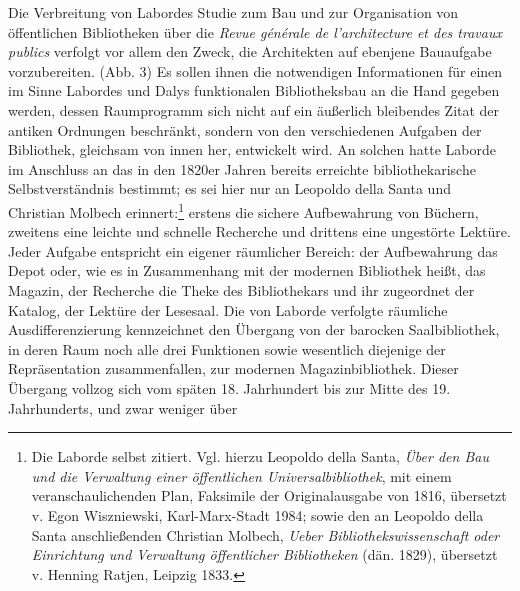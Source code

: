Die Verbreitung von Labordes Studie zum Bau und zur Organisation von
öffentlichen Bibliotheken über die \emph{Revue générale de
l'architecture et des travaux publics} verfolgt vor allem den Zweck, die
Architekten auf ebenjene Bauaufgabe vorzubereiten. (Abb. 3) Es sollen
ihnen die notwendigen Informationen für einen im Sinne Labordes und
Dalys funktionalen Bibliotheksbau an die Hand gegeben werden, dessen
Raumprogramm sich nicht auf ein äußerlich bleibendes Zitat der antiken
Ordnungen beschränkt, sondern von den verschiedenen Aufgaben der
Bibliothek, gleichsam von innen her, entwickelt wird. An solchen hatte
Laborde im Anschluss an das in den 1820er Jahren bereits erreichte
bibliothekarische Selbstverständnis bestimmt; es sei hier nur an
Leopoldo della Santa und Christian Molbech erinnert:\footnote{Die
  Laborde selbst zitiert. Vgl. hierzu Leopoldo della Santa, \emph{Über
  den Bau und die Verwaltung einer öffentlichen Universalbibliothek},
  mit einem veranschaulichenden Plan, Faksimile der Originalausgabe von
  1816, übersetzt v. Egon Wiszniewski, Karl-Marx-Stadt 1984; sowie den
  an Leopoldo della Santa anschließenden Christian Molbech, \emph{Ueber
  Bibliothekswissenschaft oder Einrichtung und Verwaltung öffentlicher
  Bibliotheken} (dän. 1829), übersetzt v. Henning Ratjen, Leipzig 1833.}
erstens die sichere Aufbewahrung von Büchern, zweitens eine leichte und
schnelle Recherche und drittens eine ungestörte Lektüre. Jeder
Aufgabe entspricht ein eigener räumlicher Bereich: der Aufbewahrung das
Depot oder, wie es in Zusammenhang mit der modernen Bibliothek heißt,
das Magazin, der Recherche die Theke des Bibliothekars und ihr
zugeordnet der Katalog, der Lektüre der Lesesaal. Die von Laborde
verfolgte räumliche Ausdifferenzierung kennzeichnet den Übergang von der
barocken Saalbibliothek, in deren Raum noch alle drei Funktionen sowie
wesentlich diejenige der Repräsentation zusammenfallen, zur modernen
Magazinbibliothek. Dieser Übergang vollzog sich vom späten 18.
Jahrhundert bis zur Mitte des 19. Jahrhunderts, und zwar weniger über
